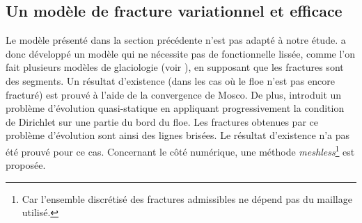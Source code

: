 \subsection{Un modèle de fracture variationnel et efficace} 

Le modèle présenté dans la section précédente n'est pas adapté à notre étude. \citeauthor{balasoiu2020halthesis} a donc développé un modèle qui ne nécessite pas de fonctionnelle lissée, comme l'on fait plusieurs modèles de glaciologie (voir \parencite{lu2015plane}), en supposant que les fractures sont des segments. Un résultat d'existence (dans les cas où le floe n'est pas encore fracturé) est prouvé à l'aide de la convergence de Mosco. De plus, \citeauthor{balasoiu2020halthesis} introduit un problème d’évolution quasi-statique en appliquant progressivement la condition de Dirichlet sur une partie du bord du floe. Les fractures obtenues par ce problème d’évolution sont ainsi des lignes brisées. Le résultat d'existence n'a pas été prouvé pour ce cas. Concernant le côté numérique, une méthode \textit{meshless}\footnote{Car l’ensemble discrétisé des fractures admissibles ne dépend pas du maillage utilisé.} est proposée.

